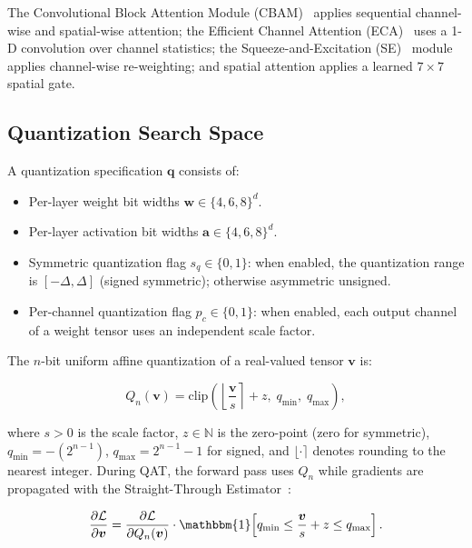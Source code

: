 \documentclass[journal]{IEEEtran}
\newcommand{\Nbb}{\mathbb{N}}
\begin{document}
\noindent
The Convolutional Block Attention Module
(CBAM)~\cite{woo2018cbam} applies sequential channel-wise and spatial-wise
attention; the Efficient Channel Attention (ECA)~\cite{wang2020eca} uses a
1-D convolution over channel statistics; the Squeeze-and-Excitation
(SE)~\cite{hu2018squeeze} module applies channel-wise re-weighting; and
spatial attention applies a learned $7\times7$ spatial gate.

\subsection{Quantization Search Space}
\label{sec:quant_space}

A quantization specification $\bm{q}$ consists of:

\begin{itemize}
\item Per-layer weight bit widths $\bm{w} \in \{4, 6, 8\}^d$.
\item Per-layer activation bit widths $\bm{a} \in \{4, 6, 8\}^d$.
\item Symmetric quantization flag $s_q \in \{0, 1\}$:
  when enabled, the quantization range is $[-\Delta, \Delta]$ (signed
  symmetric); otherwise asymmetric unsigned.
\item Per-channel quantization flag $p_c \in \{0, 1\}$:
  when enabled, each output channel of a weight tensor uses an independent
  scale factor.
\end{itemize}

\noindent
The $n$-bit uniform affine quantization of a real-valued tensor $\bm{v}$ is:

\begin{equation}
Q_n(\bm{v}) = \mathrm{clip}\!\left(
  \left\lfloor \frac{\bm{v}}{s} \right\rceil + z,\;
  q_{\min},\; q_{\max}
\right),
\label{eq:quant}
\end{equation}

where $s > 0$ is the scale factor, $z \in \Nbb$ is the zero-point
(zero for symmetric), $q_{\min} = -(2^{n-1})$,
$q_{\max} = 2^{n-1} - 1$ for signed, and
$\lfloor \cdot \rceil$ denotes rounding to the nearest integer.
During QAT, the forward pass uses $Q_n$ while gradients are propagated
with the Straight-Through Estimator~\cite{bengio2013estimating}:

\begin{equation}
\frac{\partial \mathcal{L}}{\partial \bm{v}}
= \frac{\partial \mathcal{L}}{\partial Q_n(\bm{v})}
\cdot \mathbbm{1}\!\left[q_{\min} \leq \frac{\bm{v}}{s} + z \leq q_{\max}\right].
\label{eq:ste}
\end{equation}
\end{document}
